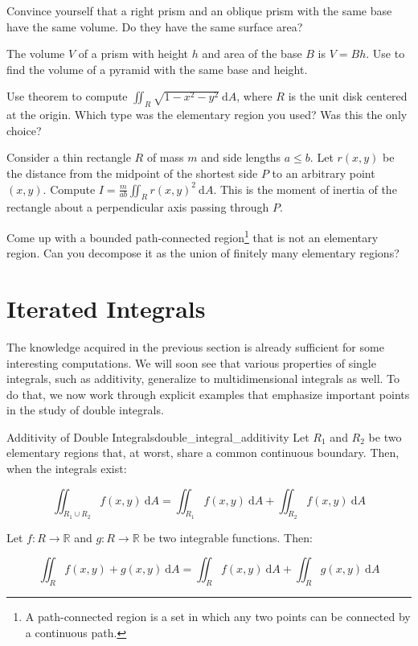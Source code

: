 \begin{exerciselist}
     \item Convince yourself that a right prism and an oblique prism with the same base have the same volume. Do they have the same surface area?
     \item The volume $V$ of a prism with height $h$ and area of the base $B$ is $V=B h$. Use  to find the volume of a pyramid with the same base and height.
     \item Use  theorem to compute $\iint_R \sqrt{1-x^2-y^2} \ \mathrm{d} A$, where $R$ is the unit disk centered at the origin. Which type was the elementary region you used? Was this the only choice?
     \item Consider a thin rectangle $R$ of mass $m$ and side lengths $a\leq b$. Let $r(x,y)$ be the distance from the midpoint of the shortest side $P$ to an arbitrary point $(x,y)$. Compute $I = \frac{m}{a b} \iint_R r(x,y)^2 \ \mathrm{d} A$. This is the moment of inertia of the rectangle about a perpendicular axis passing through $P$.
     \item Come up with a bounded path-connected region\footnote{A path-connected region is a set in which any two points can be connected by a continuous path.} that is not an elementary region. Can you decompose it as the union of finitely many elementary regions? %
\end{exerciselist}

\section{Iterated Integrals}
\label{sec:iterated_integrals}
The knowledge acquired in the previous section is already sufficient for some interesting computations. We will soon see that various properties of single integrals, such as additivity, generalize to multidimensional integrals as well. To do that, we now work through explicit examples that emphasize important points in the study of double integrals.

\begin{aproposition}{Additivity of Double Integrals}{double_integral_additivity}
    Let $R_1$ and $R_2$ be two elementary regions that, at worst, share a common continuous boundary. Then, when the integrals exist:

    \begin{equation*}
        \iint_{R_1 \cup R_2} f(x,y) \ \mathrm{d}A = \iint_{R_1} f(x,y) \ \mathrm{d}A + \iint_{R_2} f(x,y) \ \mathrm{d}A
    \end{equation*}

    Let $f: R \rightarrow \mathbb{R}$ and $g: R \rightarrow \mathbb{R}$ be two integrable functions. Then:

    \begin{equation*}
        \iint_{R} f(x,y) +g(x,y) \ \mathrm{d}A = \iint_{R} f(x,y) \ \mathrm{d}A + \iint_{R} g(x,y) \ \mathrm{d}A
    \end{equation*}
\end{aproposition}

